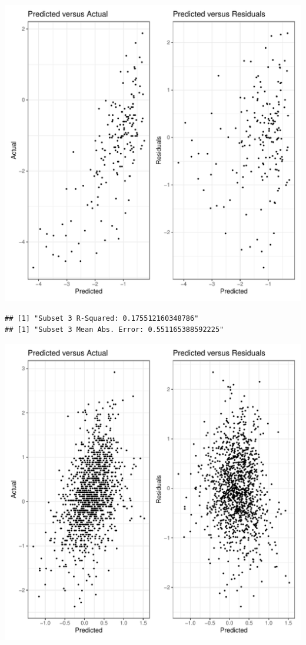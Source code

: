 \documentclass{article}\usepackage[]{graphicx}\usepackage[]{xcolor}
\makeatletter
\def\maxwidth{ %
  \ifdim\Gin@nat@width>\linewidth
    \linewidth
  \else
    \Gin@nat@width
  \fi
}
\newenvironment{kframe}{%
 \def\at@end@of@kframe{}%
 \ifinner\ifhmode%
  \def\at@end@of@kframe{\end{minipage}}%
  \begin{minipage}{\columnwidth}%
 \fi\fi%
 \def\FrameCommand##1{\hskip\@totalleftmargin \hskip-\fboxsep
 \colorbox{shadecolor}{##1}\hskip-\fboxsep
     \hskip-\linewidth \hskip-\@totalleftmargin \hskip\columnwidth}%
 \MakeFramed {\advance\hsize-\width
   \@totalleftmargin\z@ \linewidth\hsize
   \@setminipage}}%
 {\par\unskip\endMakeFramed%
 \at@end@of@kframe}
\newenvironment{knitrout}{}{} %
\makeatother
\begin{document}
\begin{knitrout}
\begin{kframe}
\end{kframe}
\includegraphics[width=\maxwidth]{figure/unnamed-chunk-13-2} 
\begin{kframe}\begin{verbatim}
## [1] "Subset 3 R-Squared: 0.175512160348786"
## [1] "Subset 3 Mean Abs. Error: 0.551165388592225"
\end{verbatim}
\end{kframe}
\includegraphics[width=\maxwidth]{figure/unnamed-chunk-13-3} 

\end{knitrout}
\end{document}
